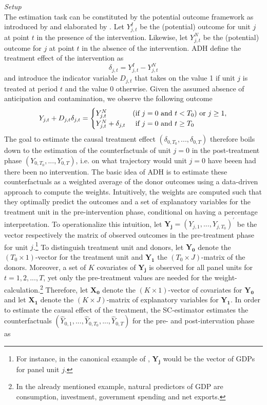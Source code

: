 \textit{Setup} \\
The estimation task can be constituted by the potential outcome framework as introduced by \cite{neyman:1923} and elaborated by \cite{rubin:1974}. Let $Y^{I}_{j,t}$ be the (potential) outcome for unit $j$ at point $t$ in the presence of the intervention. Likewise, let $Y^{N}_{j,t}$ be the (potential) outcome for $j$ at point $t$ in the absence of the intervention. \ac{ADH} define the treatment effect of the intervention as 
\[
\delta_{j,t} = Y^{I}_{j,t} - Y^{N}_{j,t}
\] 
and introduce the indicator variable $D_{j,t}$ that takes on the value 1 if unit $j$ is treated at period $t$ and the value 0 otherwise. Given the assumed absence of anticipation and contamination, we observe the following outcome
\[
Y_{j,t} + D_{j,t} \delta_{j,t} = 
\begin{cases}
	Y^{N}_{j,t} &\text{(if } j = 0 \text{ and } t < T_0\text{)} \text{ or } j \geq 1, \\
	Y^{N}_{j,t} + \delta_{j,t} &  \text{\phantom{(}if } j = 0 \text{ and } t \geq T_0
\end{cases}
\] 
The goal to estimate the causal treatment effect $(\delta_{0,T_0}, ..., \delta_{0,T})$ therefore boils down to the estimation of the counterfactuals of unit $j = 0$ in the post-treatment phase $(Y_{0,T_0}, ..., Y_{0,T})$, i.e. on what trajectory would unit $j=0$ have beeen had there been no intervention. The basic idea of \ac{ADH} is to estimate these counterfactuals as a weighted average of the donor outcomes using a data-driven approach to compute the weights. Intuitively, the weights are computed such that they optimally predict the outcomes and a set of explanatory variables for the treatment unit in the pre-intervention phase, conditional on having a percentage interpretation. To operationalize this intuition, let $\boldsymbol{Y_j} = (Y_{j,1}, ..., Y_{j,T_0})^\prime$ be the vector respectively the matrix of observed outcomes in the pre-treatment phase for unit $j$.\footnote{For instance, in the canonical example of \cite{abadie:2003}, $\boldsymbol{Y_j}$ would be the vector of \ac{GDP}s for panel unit $j$.} To distinguish treatment unit and donors, let $\boldsymbol{Y_0}$ denote the $(T_0 \times 1)$-vector for the treatment unit and $\boldsymbol{Y_1}$ the $(T_0 \times J)$-matrix of the donors. Moreover, a set of $K$ covariates of $\boldsymbol{Y_j}$ is observed for all panel units for $t = 1,2,...,T$, yet only the pre-treatment values are needed for the weight-calculation.\footnote{In the already mentioned example, natural predictors of \ac{GDP} are consumption, investment, government spending and net exports.} Therefore, let $\boldsymbol{X_0}$ denote the $(K \times 1)$-vector of covariates for $\boldsymbol{Y_0}$ and let $\boldsymbol{X_1}$ denote the $(K \times J)$-matrix of explanatory variables for $\boldsymbol{Y_1}$. In order to estimate the causal effect of the treatment, the \ac{SC}-estimator estimates the counterfactuals $(\widehat{Y}_{0,1}, ...,\widehat{Y}_{0,T_0},..., \widehat{Y}_{0,T})$ for the pre- and post-intervation phase as 
